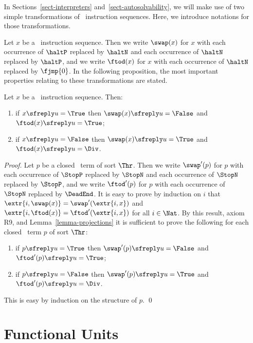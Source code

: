 \documentclass[fleqn]{llncs}
\begin{document}
In Sections~\ref{sect-interpreters} and~\ref{sect-autosolvability}, we
will make use of two simple transformations of \PGLBbt\ instruction
sequences.
Here, we introduce notations for those transformations.

Let $x$ be a \PGLBbt\ instruction sequence.
Then we write $\swap(x)$ for $x$ with each occurrence of $\haltP$
replaced by $\haltN$ and each occurrence of $\haltN$ replaced by
$\haltP$, and we write $\ftod(x)$ for $x$ with each occurrence of
$\haltN$ replaced by $\fjmp{0}$.
In the following proposition, the most important properties relating to
these transformations are stated.
\begin{proposition}
\label{prop-swap-f2d}
Let $x$ be a \PGLBbt\ instruction sequence.
Then:
\begin{enumerate}
\item
if $x \sfreply u = \True$ then $\swap(x) \sfreply u = \False$ and
$\ftod(x) \sfreply u = \True$;
\item
if $x \sfreply u = \False$ then $\swap(x) \sfreply u = \True$ and
$\ftod(x) \sfreply u = \Div$.
\end{enumerate}
\end{proposition}
\begin{proof}
Let $p$ be a closed \BTAbt\ term of sort $\Thr$.
Then we write $\swap'(p)$ for $p$ with each occurrence of $\StopP$
replaced by $\StopN$ and each occurrence of $\StopN$ replaced by
$\StopP$, and we write $\ftod'(p)$ for $p$ with each occurrence of
$\StopN$ replaced by $\DeadEnd$.
It is easy to prove by induction on $i$ that
$\extr{i,\swap(x)} = \swap'(\extr{i,x})$ and
$\extr{i,\ftod(x)} = \ftod'(\extr{i,x})$ for all $i \in \Nat$.
By this result, axiom R9, and Lemma~\ref{lemma-projections} it is
sufficient to prove the following for each closed \BTAbt\ term $p$ of
sort $\Thr$:
\begin{enumerate}
\item[]
if $p \sfreply u = \True$ then $\swap'(p) \sfreply u = \False$ and
$\ftod'(p) \sfreply u = \True$;
\item[]
if $p \sfreply u = \False$ then $\swap'(p) \sfreply u = \True$ and
$\ftod'(p) \sfreply u = \Div$.
\end{enumerate}
This is easy by induction on the structure of $p$.
\qed
\end{proof}

\section{Functional Units}
\label{sect-func-unit}
\end{document}
